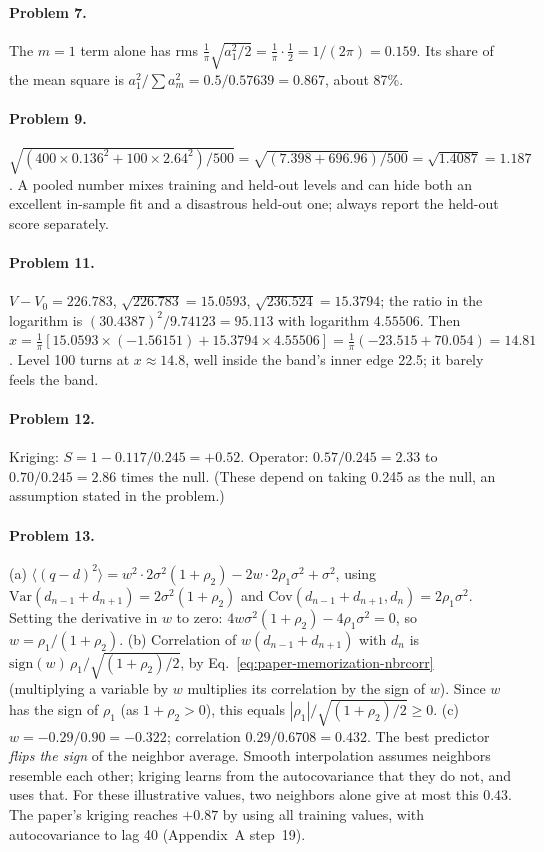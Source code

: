 \paragraph{Problem 7.} The $m=1$ term alone has rms $\frac1\pi\sqrt{a_1^2/2}=\frac1\pi\cdot\frac12=1/(2\pi)=0.159$. Its share of the mean square is $a_1^2/\sum a_m^2=0.5/0.57639=0.867$, about 87\%.

\paragraph{Problem 9.} $\sqrt{(400\times0.136^2+100\times2.64^2)/500}=\sqrt{(7.398+696.96)/500}=\sqrt{1.4087}=1.187$. A pooled number mixes training and held-out levels and can hide both an excellent in-sample fit and a disastrous held-out one; always report the held-out score separately.

\paragraph{Problem 11.} $V-V_0=226.783$, $\sqrt{226.783}=15.0593$, $\sqrt{236.524}=15.3794$; the ratio in the logarithm is $(30.4387)^2/9.74123=95.113$ with logarithm $4.55506$. Then $x=\frac1\pi[15.0593\times(-1.56151)+15.3794\times4.55506]=\frac1\pi(-23.515+70.054)=14.81$. Level 100 turns at $x\approx14.8$, well inside the band's inner edge 22.5; it barely feels the band.

\paragraph{Problem 12.} Kriging: $S=1-0.117/0.245=+0.52$. Operator: $0.57/0.245=2.33$ to $0.70/0.245=2.86$ times the null. (These depend on taking 0.245 as the null, an assumption stated in the problem.)

\paragraph{Problem 13.} (a) $\langle(q-d)^2\rangle=w^2\cdot2\sigma^2(1+\rho_2)-2w\cdot2\rho_1\sigma^2+\sigma^2$, using $\mathrm{Var}(d_{n-1}+d_{n+1})=2\sigma^2(1+\rho_2)$ and $\mathrm{Cov}(d_{n-1}+d_{n+1},d_n)=2\rho_1\sigma^2$. Setting the derivative in $w$ to zero: $4w\sigma^2(1+\rho_2)-4\rho_1\sigma^2=0$, so $w=\rho_1/(1+\rho_2)$. (b) Correlation of $w(d_{n-1}+d_{n+1})$ with $d_n$ is $\mathrm{sign}(w)\,\rho_1/\sqrt{(1+\rho_2)/2}$, by Eq.~\eqref{eq:paper-memorization-nbrcorr} (multiplying a variable by $w$ multiplies its correlation by the sign of $w$). Since $w$ has the sign of $\rho_1$ (as $1+\rho_2>0$), this equals $|\rho_1|/\sqrt{(1+\rho_2)/2}\ge0$. (c) $w=-0.29/0.90=-0.322$; correlation $0.29/0.6708=0.432$. The best predictor \emph{flips the sign} of the neighbor average. Smooth interpolation assumes neighbors resemble each other; kriging learns from the autocovariance that they do not, and uses that. For these illustrative values, two neighbors alone give at most this $0.43$. The paper's kriging reaches $+0.87$ by using all training values, with autocovariance to lag 40 (Appendix~A step~19).

